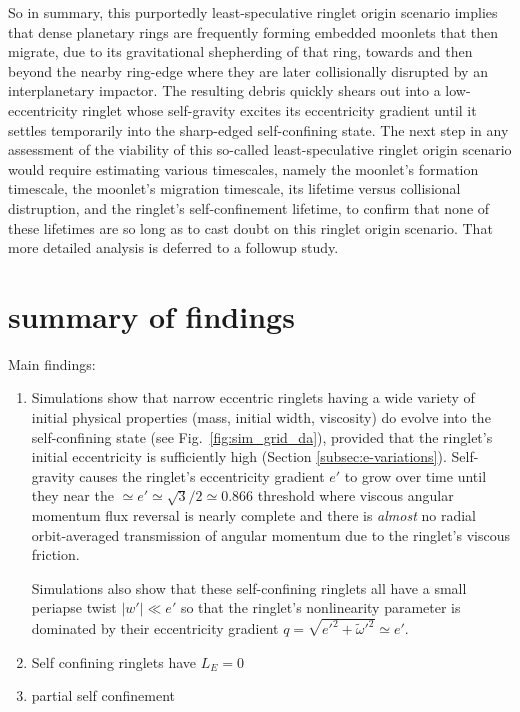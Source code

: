 \documentclass[preprint]{aastex62}
\begin{document}
So in summary, this purportedly least-speculative ringlet origin scenario
implies that dense planetary rings are frequently forming embedded moonlets that then migrate, 
due to its gravitational shepherding of that ring, towards and then beyond the nearby ring-edge
where they are later collisionally disrupted by an interplanetary impactor. The resulting debris quickly
shears out into a low-eccentricity ringlet whose self-gravity excites its eccentricity gradient
until it settles temporarily into the sharp-edged self-confining state. The next step in any assessment of the viability
of this so-called least-speculative ringlet origin scenario would require estimating various timescales,
namely the moonlet's formation timescale, the moonlet's migration timescale, its lifetime versus collisional
distruption, and the ringlet's self-confinement lifetime, to confirm that none of these lifetimes are so
long as to cast doubt on this ringlet origin scenario. That more detailed analysis is deferred to a followup
study. 










\section{summary of findings}
\label{sec:summary}

Main findings:

\begin{enumerate}

\item Simulations show that narrow eccentric ringlets having a wide variety of initial 
physical properties (mass, initial width, viscosity) do evolve
into the self-confining state (see Fig.\ \ref{fig:sim_grid_da}), 
provided that the ringlet's initial eccentricity is sufficiently high (Section \ref{subsec:e-variations}). 
Self-gravity causes the ringlet's eccentricity gradient $e'$ to grow over time until they near the
$\simeq e'\simeq\sqrt{3}/2\simeq0.866$ threshold where viscous angular momentum flux
reversal is nearly complete and there is {\em almost} no radial orbit-averaged
transmission of angular momentum due to the ringlet's viscous friction.

Simulations also show that these self-confining ringlets all have a small 
periapse twist $|w'|\ll e'$ so that the
ringlet's nonlinearity parameter is dominated by their eccentricity gradient
$q=\sqrt{e'^2 + \tilde{\omega}'^2}\simeq e'$.

\item Self confining ringlets have $L_E=0$

\item partial self confinement

\end{enumerate}
\end{document}
